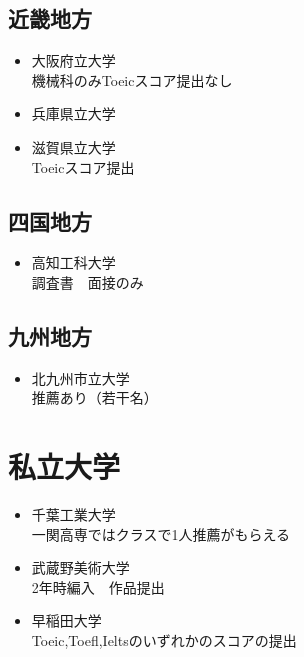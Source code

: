 \documentclass[platex, dvipdfmx, a4paper]{jarticle}
\begin{document}
      \subsection{近畿地方}
        \begin{itemize}
          \item 大阪府立大学
            \\機械科のみToeicスコア提出なし
          \item 兵庫県立大学
          \item 滋賀県立大学
            \\Toeicスコア提出
        \end{itemize}
      \subsection{四国地方}
        \begin{itemize}
          \item 高知工科大学
            \\調査書　面接のみ
        \end{itemize}
      \subsection{九州地方}
        \begin{itemize}
          \item 北九州市立大学
            \\推薦あり（若干名）
        \end{itemize}
    \section{私立大学}
      \begin{itemize}
        \item 千葉工業大学
          \\一関高専ではクラスで1人推薦がもらえる
        \item 武蔵野美術大学
          \\2年時編入　作品提出
        \item 早稲田大学
          \\Toeic,Toefl,Ieltsのいずれかのスコアの提出
      \end{itemize}
      \printbibliography[title=参考文献]
\end{document}
